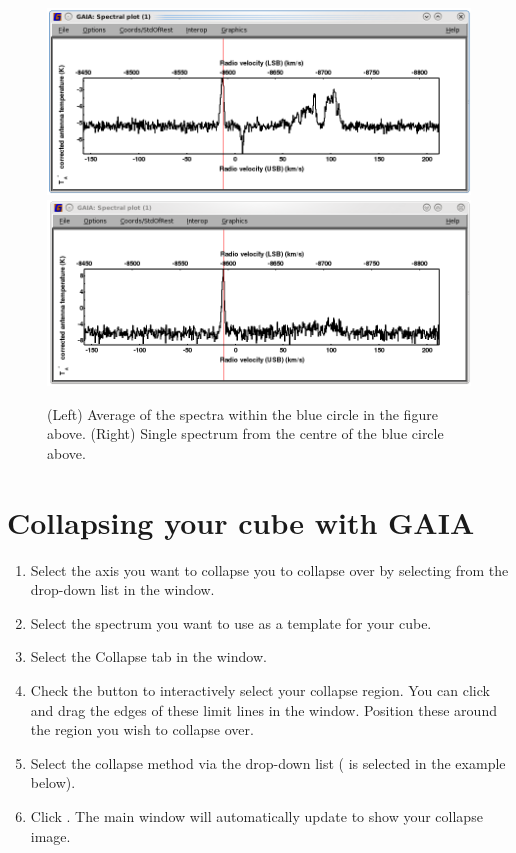 \documentclass[11pt,oneside,chapters]{starlink}
\begin{document}
\begin{enumerate}[label=(\textbf{\arabic*})]
\begin{figure}[ht!]
\begin{center}
\includegraphics[width=0.48\linewidth]{sc20_gaia_avgspec2}
\hspace{0.5mm}
\includegraphics[width=0.48\linewidth]{sc20_gaia_avgspec3}
\caption[Example of averaged spectra.]{\label{fig:gaia_avgspec2}
 (Left) Average of the spectra within the blue circle in the figure
  above. (Right) Single spectrum from the centre of the blue circle above.}
\end{center}
\end{figure}

\end{enumerate}

\section{Collapsing your cube with GAIA}
\label{sec:gaiacollapse}

\begin{enumerate}[label=(\textbf{\arabic*})]

\item Select the axis you want to collapse you to collapse over by
selecting from the  drop-down list in the
 window.

\item Select the spectrum you want to use as a template for your cube.

\item Select the Collapse tab in the  window.

\item Check the  button to
interactively select your collapse region.  You can click and drag the
edges of these limit lines in the  window.
Position these around the region you wish to collapse over.

\item Select the collapse method via the  drop-down list ( is selected in the example below).

\item Click . The main window will automatically update
to show your collapse image.
\end{enumerate}
\end{document}
